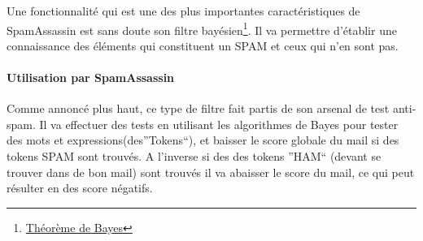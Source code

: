 \documentclass[a4paper,11pt]{article}
\begin{document}
Une fonctionnalité qui est une des plus importantes caractéristiques de SpamAssassin est sans doute son filtre
bayésien\footnote{\href {https://fr.wikipedia.org/wiki/Th\%C3\%A9or\%C3\%A8me\_de_Bayes}{Théorème de Bayes}}.
Il va permettre d'établir une connaissance des éléments qui constituent un SPAM et ceux qui n'en sont pas.
\paragraph{Utilisation par SpamAssassin}

Comme annoncé plus haut, ce type de filtre fait partis de son arsenal de test anti-spam. Il va effectuer des tests 
en utilisant les algorithmes de Bayes pour tester des mots et expressions(des''Tokens``), et baisser le score globale du mail si des tokens SPAM sont trouvés. 
A l'inverse si des des tokens ''HAM`` (devant se trouver dans de bon mail) sont trouvés il va abaisser le score du mail, ce qui peut résulter en
des score négatifs.
\linebreak
\end{document}
